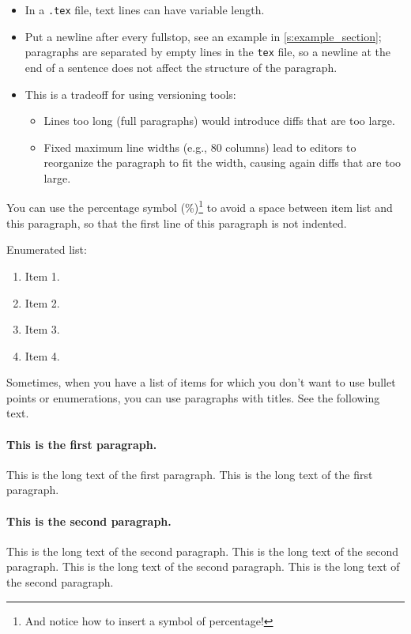 \iffalse

\begin{itemize}
\item In a \texttt{.tex} file, text lines can have variable length.
\item Put a newline after every fullstop, see an example in \cref{s:example_section}; paragraphs are separated by empty lines in the \texttt{tex} file, so a newline at the end of a sentence does not affect the structure of the paragraph.
\item This is a tradeoff for using versioning tools:
\begin{itemize}
\item Lines too long (full paragraphs) would introduce diffs that are too large.
\item Fixed maximum line widths (e.g., $80$ columns) lead to editors to reorganize the paragraph to fit the width, causing again diffs that are too large.
\end{itemize}
\end{itemize}
%
You can use the percentage symbol (\%)\footnote{And notice how to insert a symbol of percentage!} to avoid a space between item list and this paragraph, so that the first line of this paragraph is not indented.

Enumerated list:

\begin{enumerate}
\item Item 1.
\item Item 2.
\item Item 3.
\item Item 4.
\end{enumerate}

Sometimes, when you have a list of items for which you don't want to use bullet points or enumerations, you can use paragraphs with titles.
See the following text.

\paragraph{This is the first paragraph.}
This is the long text of the first paragraph.
This is the long text of the first paragraph.

\paragraph{This is the second paragraph.}
This is the long text of the second paragraph.
This is the long text of the second paragraph.
This is the long text of the second paragraph.
This is the long text of the second paragraph.

